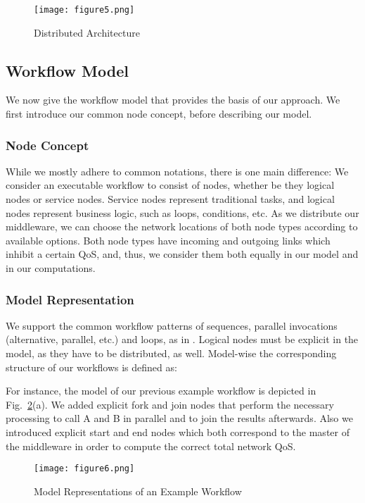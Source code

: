 \documentclass[10pt, conference, compsocconf]{IEEEtran}
\newcommand{\oneImage}{3.2in}
\begin{document}
\begin{figure}[htb!]
  \centering
	\texttt{[image: figure5.png]}
	\caption{Distributed Architecture}
	\label{fig:distributed_architecture}
\end{figure}

\subsection{Workflow Model}
\noindent We now give the workflow model that provides the basis of our approach.
We first introduce our common node concept, before describing our model.

\subsubsection{Node Concept}
\noindent While we mostly adhere to common notations, there is one main difference:
We consider an executable workflow to consist of nodes,
	whether be they logical nodes or service nodes.
Service nodes represent traditional tasks, and logical nodes represent business logic,
	such as loops, conditions, etc.
As we distribute our middleware,
	we can choose the network locations of both node types according to available options.
Both node types have incoming and outgoing links which inhibit a certain QoS,
	and, thus, we consider them both equally in our model and in our computations.

\subsubsection{Model Representation}
\noindent We support the common workflow patterns of sequences, parallel invocations (alternative, parallel, etc.) and loops,
	as in \cite{Jaeger2004}.
Logical nodes must be explicit in the model, as they have to be distributed, as well.
Model-wise the corresponding structure of our workflows is defined as:



\noindent For instance, the model of our previous example workflow is depicted in Fig.~\ref{fig:representations}(a).
We added explicit fork and join nodes that perform the necessary processing to call A and B in parallel and to join the results afterwards.
Also we introduced explicit start and end nodes which both correspond to the master of the middleware
	in order to compute the correct total network QoS.
	
\begin{figure}[htb!]
	\centering
	\texttt{[image: figure6.png]}
	\caption{Model Representations of an Example Workflow}
	\label{fig:representations}
\end{figure}
\end{document}
